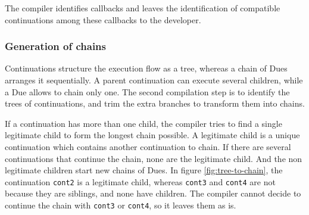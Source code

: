 The compiler identifies callbacks and leaves the identification of compatible continuations among these callbacks to the developer.




\subsubsection{Generation of chains}

Continuations structure the execution flow as a tree, whereas a chain of Dues arranges it sequentially.
A parent continuation can execute several children, while a Due allows to chain only one.
The second compilation step is to identify the trees of continuations, and trim the extra branches to transform them into chains.

If a continuation has more than one child, the compiler tries to find a single legitimate child to form the longest chain possible.
A legitimate child is a unique continuation which contains another continuation to chain.
If there are several continuations that continue the chain, none are the legitimate child.
And the non legitimate children start new chains of Dues.
In figure \ref{fig:tree-to-chain}, the continuation \texttt{cont2} is a legitimate child, whereas \texttt{cont3} and \texttt{cont4} are not because they are siblings, and none have children.
The compiler cannot decide to continue the chain with \texttt{cont3} or \texttt{cont4}, so it leaves them as is.

